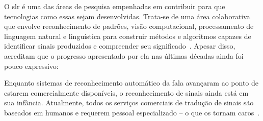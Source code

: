 O \acrfull{slr} é uma das áreas de pesquisa empenhadas em contribuir para que tecnologias como essas sejam desenvolvidas. Trata-se de uma área colaborativa que envolve reconhecimento de padrões, visão computacional, processamento de linguagem natural e linguística para construir métodos e algoritmos capazes de identificar sinais produzidos e compreender seu significado~\cite{wadhawan-2019-slr-literature-review}. 
Apesar disso,  acreditam que o progresso apresentado por ela nas últimas décadas ainda foi pouco expressivo:

\begin{citacao}
    Enquanto sistemas de reconhecimento automático da fala avançaram ao ponto de estarem comercialmente disponíveis, o reconhecimento de sinais ainda está em sua infância. Atualmente, todos os serviços comerciais de tradução de sinais são baseados em humanos e requerem pessoal especializado -- o que os tornam caros~\cite[tradução nossa]{cooper-2011-slr}.
\end{citacao}


